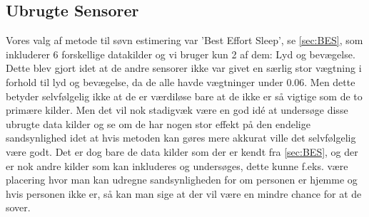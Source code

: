 \subsection{Ubrugte Sensorer}
Vores valg af metode til søvn estimering var 'Best Effort Sleep', se \cref{sec:BES}, som inkluderer 6 forskellige datakilder og vi bruger kun 2 af dem: Lyd og bevægelse. 
Dette blev gjort idet at de andre sensorer ikke var givet en særlig stor vægtning i forhold til lyd og bevægelse, da de alle havde vægtninger under 0.06. Men dette betyder selvfølgelig ikke at de er værdiløse bare at de ikke er så vigtige som de to primære kilder.
Men det vil nok stadigvæk være en god idé at undersøge disse ubrugte data kilder og se om de har nogen stor effekt på den endelige sandsynlighed idet at hvis metoden kan gøres mere akkurat ville det  selvfølgelig være godt. 
Det er dog bare de data kilder som der er kendt fra \cref{sec:BES}, og der er nok andre kilder som kan inkluderes og undersøges, dette kunne f.eks. være placering hvor man kan udregne sandsynligheden for om personen er hjemme og hvis personen ikke er, så kan man sige at der vil være en mindre chance for at de sover.